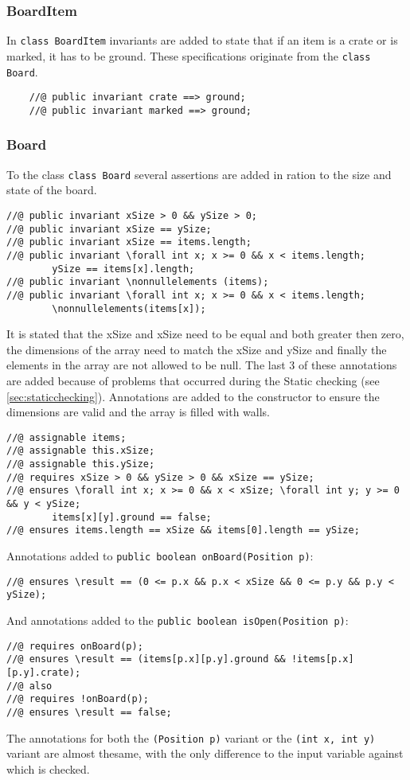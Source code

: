 \documentclass[a4paper]{article}
\begin{document}
	\subsubsection{BoardItem}
	In \texttt{class BoardItem} invariants are added to state that if an item is a crate or is marked, it has to be ground. These specifications originate from the \texttt{class Board}.
	\begin{lstlisting}
	//@ public invariant crate ==> ground;
	//@ public invariant marked ==> ground;
	\end{lstlisting}
	
	\subsubsection{Board}
	To the class \texttt{class Board} several assertions are added in ration to the size and state of the board.
	\begin{lstlisting}
//@ public invariant xSize > 0 && ySize > 0;
//@ public invariant xSize == ySize;
//@ public invariant xSize == items.length;
//@ public invariant \forall int x; x >= 0 && x < items.length; 
		ySize == items[x].length;
//@ public invariant \nonnullelements (items);
//@ public invariant \forall int x; x >= 0 && x < items.length; 
		\nonnullelements(items[x]);
	\end{lstlisting}
	It is stated that the xSize and xSize need to be equal and both greater then zero, the dimensions of the array need to match the xSize and ySize and finally the elements in the array are not allowed to be null. The last 3 of these annotations are added because of problems that occurred during the Static checking (see \ref{sec:staticchecking}).
	Annotations are added to the constructor to ensure the dimensions are valid and the array is filled with walls.
	\begin{lstlisting}
//@ assignable items;
//@ assignable this.xSize;
//@ assignable this.ySize;
//@ requires xSize > 0 && ySize > 0 && xSize == ySize;
//@ ensures \forall int x; x >= 0 && x < xSize; \forall int y; y >= 0 && y < ySize; 
		items[x][y].ground == false;
//@ ensures items.length == xSize && items[0].length == ySize;
	\end{lstlisting}
	Annotations added to \texttt{public boolean onBoard(Position p)}:
	\begin{lstlisting}
//@ ensures \result == (0 <= p.x && p.x < xSize && 0 <= p.y && p.y < ySize);
	\end{lstlisting}
	And annotations added to the \texttt{public boolean isOpen(Position p)}:
	\begin{lstlisting}
//@ requires onBoard(p);
//@ ensures \result == (items[p.x][p.y].ground && !items[p.x][p.y].crate);
//@ also
//@ requires !onBoard(p);
//@ ensures \result == false;
	\end{lstlisting}
	The annotations for both the \texttt{(Position p)} variant or the \texttt{(int x, int y)} variant are almost thesame, with the only difference to the input variable against which is checked.
	
\end{document}
